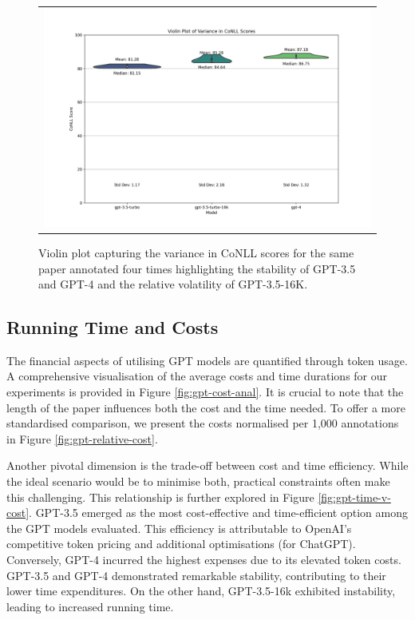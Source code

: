 \begin{figure}[htpb]
  \centering
  \begin{tabular}{c}
  \includegraphics[width=14cm]{images/variance-conll.png}
  \end{tabular}
  \caption[The variance]{Violin plot capturing the variance in CoNLL scores for the same paper annotated four times highlighting the stability of GPT-3.5 and GPT-4 and the relative volatility of GPT-3.5-16K.}\label{fig:violin-variance}
\end{figure}

\subsection{Running Time and Costs}

The financial aspects of utilising GPT models are quantified through token usage. A comprehensive visualisation of the average costs and time durations for our experiments is provided in Figure \ref{fig:gpt-cost-anal}. It is crucial to note that the length of the paper influences both the cost and the time needed. To offer a more standardised comparison, we present the costs normalised per 1,000 annotations in Figure \ref{fig:gpt-relative-cost}.

Another pivotal dimension is the trade-off between cost and time efficiency. While the ideal scenario would be to minimise both, practical constraints often make this challenging. This relationship is further explored in Figure \ref{fig:gpt-time-v-cost}.
GPT-3.5 emerged as the most cost-effective and time-efficient option among the GPT models evaluated. This efficiency is attributable to OpenAI's competitive token pricing and additional optimisations (for ChatGPT). Conversely, GPT-4 incurred the highest expenses due to its elevated token costs. GPT-3.5 and GPT-4 demonstrated remarkable stability, contributing to their lower time expenditures. On the other hand, GPT-3.5-16k exhibited instability, leading to increased running time. %

